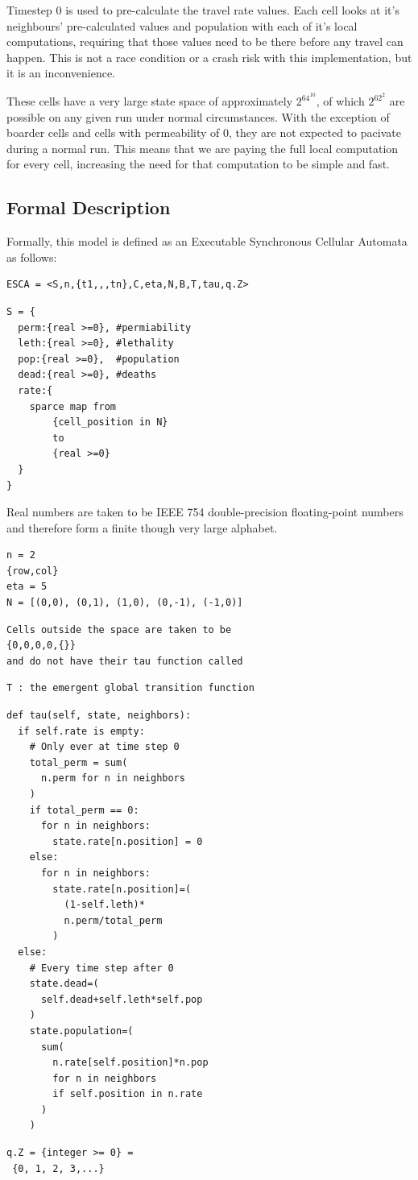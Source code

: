 \documentclass[twocolumn]{article}
\begin{document}
Timestep 0 is used to pre-calculate the travel rate values. Each cell looks at it's neighbours' pre-calculated values and population with each of it's local computations, requiring that those values need to be there before any travel can happen. This is not a race condition or a crash risk with this implementation, but it is an inconvenience.

These cells have a very large state space of approximately $2^{64^{10}}$, of which $2^{62^{2}}$ are possible on any given run under normal circumstances. With the exception of boarder cells and cells with permeability of 0, they are not expected to pacivate during a normal run. This means that we are paying the full local computation for every cell, increasing the need for that computation to be simple and fast.

\subsection{Formal Description}

Formally, this model is defined as an Executable Synchronous Cellular Automata as follows:

\begin{verbatim}
ESCA = <S,n,{t1,,,tn},C,eta,N,B,T,tau,q.Z>
\end{verbatim}
\begin{verbatim}
S = {
  perm:{real >=0}, #permiability
  leth:{real >=0}, #lethality
  pop:{real >=0},  #population
  dead:{real >=0}, #deaths
  rate:{
    sparce map from 
    	{cell_position in N}
    	to 
    	{real >=0}
  }
}
\end{verbatim}
Real numbers are taken to be IEEE 754 double-precision floating-point numbers and therefore form a finite though very large alphabet.
\begin{verbatim}
n = 2
{row,col}
eta = 5
N = [(0,0), (0,1), (1,0), (0,-1), (-1,0)]
\end{verbatim}
\begin{verbatim}
Cells outside the space are taken to be
{0,0,0,0,{}}
and do not have their tau function called
\end{verbatim}
\begin{verbatim}
T : the emergent global transition function
\end{verbatim}
\begin{verbatim}
def tau(self, state, neighbors):
  if self.rate is empty:
    # Only ever at time step 0 
    total_perm = sum(
      n.perm for n in neighbors
    )
    if total_perm == 0:
      for n in neighbors:
        state.rate[n.position] = 0
    else:
      for n in neighbors:
        state.rate[n.position]=(
          (1-self.leth)*
          n.perm/total_perm
        )
  else:
    # Every time step after 0
    state.dead=(
      self.dead+self.leth*self.pop
    )
    state.population=(
      sum(
        n.rate[self.position]*n.pop
        for n in neighbors 
        if self.position in n.rate
      )
    )
\end{verbatim}
\begin{verbatim}
q.Z = {integer >= 0} =
 {0, 1, 2, 3,...}
\end{verbatim}
\end{document}
